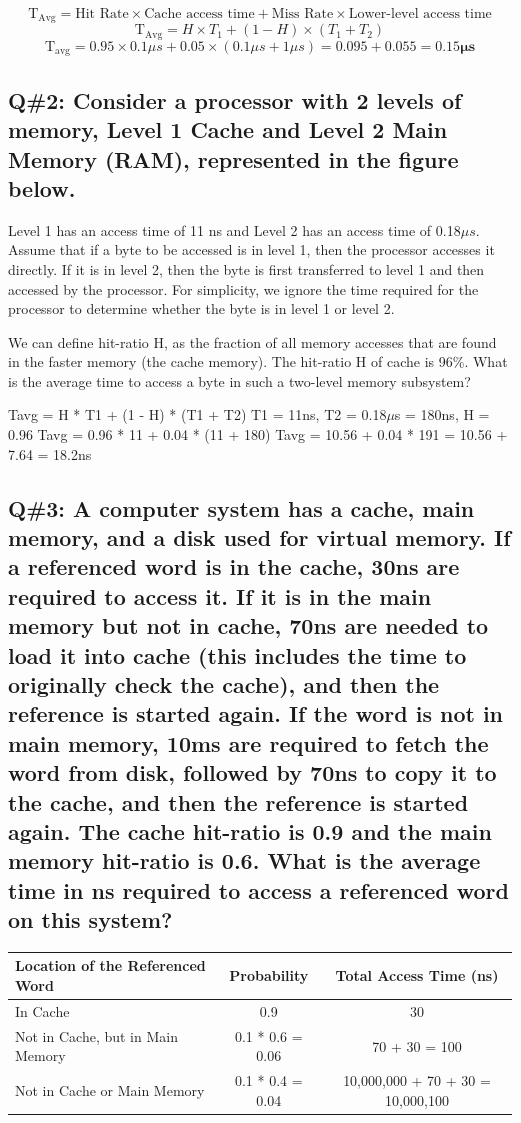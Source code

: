 \[\text{T}_{\text{Avg}} = \text{Hit Rate} \times \text{Cache access time} + \text{Miss Rate} \times \text{Lower-level access time}\]
\[
\text{T}_{\text{Avg}} = H \times T_1 + (1 - H) \times (T_1 + T_2)
\]
\[
\text{T}_{\text{avg}} = 0.95 \times 0.1\mu s + 0.05 \times (0.1\mu s + 1\mu s) = 0.095 + 0.055 = \mathbf{0.15\mu s}
\]

\subsection*{Q\#2: Consider a processor with 2 levels of memory, Level 1 Cache and Level 2 Main Memory (RAM), represented in the figure below.}

Level 1 has an access time of 11 ns and Level 2 has an access time of 0.18\(\mu s\). Assume that if a byte to be accessed is in level 1, then the processor accesses it directly. If it is in level 2, then the byte is first transferred to level 1 and then accessed by the processor. For simplicity, we ignore the time required for the processor to determine whether the byte is in level 1 or level 2.

We can define hit-ratio H, as the fraction of all memory accesses that are found in the faster memory (the cache memory). The hit-ratio H of cache is 96\%. What is the average time to access a byte in such a two-level memory subsystem?

Tavg = H * T1 + (1 - H) * (T1 + T2)
T1 = 11ns, T2 = 0.18\(\mu\)s = 180ns, H = 0.96
Tavg = 0.96 * 11 + 0.04 * (11 + 180)
Tavg = 10.56 + 0.04 * 191 = 10.56 + 7.64 = 18.2ns

\subsection*{Q\#3: A computer system has a cache, main memory, and a disk used for virtual memory. If a referenced word is in the cache, 30ns are required to access it. If it is in the main memory but not in cache, 70ns are needed to load it into cache (this includes the time to originally check the cache), and then the reference is started again. If the word is not in main memory, 10ms are required to fetch the word from disk, followed by 70ns to copy it to the cache, and then the reference is started again. The cache hit-ratio is 0.9 and the main memory hit-ratio is 0.6. What is the average time in ns required to access a referenced word on this system? }

\begin{tabular}{|l|c|c|}
\hline
\textbf{Location of the Referenced Word} & \textbf{Probability} & \textbf{Total Access Time (ns)} \\
\hline
In Cache & 0.9 & 30 \\
\hline
Not in Cache, but in Main Memory & 0.1 * 0.6 = 0.06 & 70 + 30 = 100 \\
\hline
Not in Cache or Main Memory & 0.1 * 0.4 = 0.04 & 10,000,000 + 70 + 30 = 10,000,100 \\
\hline
\end{tabular}

